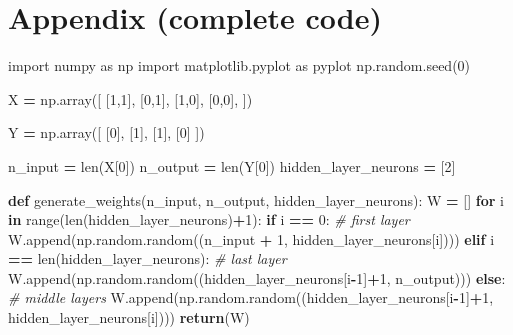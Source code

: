 \documentclass[
]{book}
\newenvironment{Shaded}{\begin{snugshade}}{\end{snugshade}}
\newcommand{\BuiltInTok}[1]{#1}
\newcommand{\CommentTok}[1]{\textcolor[rgb]{0.56,0.35,0.01}{\textit{#1}}}
\newcommand{\ControlFlowTok}[1]{\textcolor[rgb]{0.13,0.29,0.53}{\textbf{#1}}}
\newcommand{\DecValTok}[1]{\textcolor[rgb]{0.00,0.00,0.81}{#1}}
\newcommand{\ImportTok}[1]{#1}
\newcommand{\KeywordTok}[1]{\textcolor[rgb]{0.13,0.29,0.53}{\textbf{#1}}}
\newcommand{\NormalTok}[1]{#1}
\newcommand{\OperatorTok}[1]{\textcolor[rgb]{0.81,0.36,0.00}{\textbf{#1}}}
\begin{document}
\hypertarget{appendix-complete-code-2}{%
\section{Appendix (complete code)}\label{appendix-complete-code-2}}

\begin{Shaded}
\begin{Highlighting}[]
\ImportTok{import}\NormalTok{ numpy }\ImportTok{as}\NormalTok{ np}
\ImportTok{import}\NormalTok{ matplotlib.pyplot }\ImportTok{as}\NormalTok{ pyplot}
\NormalTok{np.random.seed(}\DecValTok{0}\NormalTok{)}

\NormalTok{X }\OperatorTok{=}\NormalTok{ np.array([}
\NormalTok{  [}\DecValTok{1}\NormalTok{,}\DecValTok{1}\NormalTok{],}
\NormalTok{  [}\DecValTok{0}\NormalTok{,}\DecValTok{1}\NormalTok{],}
\NormalTok{  [}\DecValTok{1}\NormalTok{,}\DecValTok{0}\NormalTok{],}
\NormalTok{  [}\DecValTok{0}\NormalTok{,}\DecValTok{0}\NormalTok{],}
\NormalTok{])}

\NormalTok{Y }\OperatorTok{=}\NormalTok{ np.array([}
\NormalTok{  [}\DecValTok{0}\NormalTok{],}
\NormalTok{  [}\DecValTok{1}\NormalTok{],}
\NormalTok{  [}\DecValTok{1}\NormalTok{],}
\NormalTok{  [}\DecValTok{0}\NormalTok{]}
\NormalTok{])}

\NormalTok{n\_input }\OperatorTok{=} \BuiltInTok{len}\NormalTok{(X[}\DecValTok{0}\NormalTok{])}
\NormalTok{n\_output }\OperatorTok{=} \BuiltInTok{len}\NormalTok{(Y[}\DecValTok{0}\NormalTok{])}
\NormalTok{hidden\_layer\_neurons }\OperatorTok{=}\NormalTok{ [}\DecValTok{2}\NormalTok{]}


\KeywordTok{def}\NormalTok{ generate\_weights(n\_input, n\_output, hidden\_layer\_neurons):}
\NormalTok{  W }\OperatorTok{=}\NormalTok{ []}
  \ControlFlowTok{for}\NormalTok{ i }\KeywordTok{in} \BuiltInTok{range}\NormalTok{(}\BuiltInTok{len}\NormalTok{(hidden\_layer\_neurons)}\OperatorTok{+}\DecValTok{1}\NormalTok{):}
    \ControlFlowTok{if}\NormalTok{ i }\OperatorTok{==} \DecValTok{0}\NormalTok{: }\CommentTok{\# first layer}
\NormalTok{      W.append(np.random.random((n\_input }\OperatorTok{+} \DecValTok{1}\NormalTok{, hidden\_layer\_neurons[i])))}
    \ControlFlowTok{elif}\NormalTok{ i }\OperatorTok{==} \BuiltInTok{len}\NormalTok{(hidden\_layer\_neurons): }\CommentTok{\# last layer}
\NormalTok{      W.append(np.random.random((hidden\_layer\_neurons[i}\OperatorTok{{-}}\DecValTok{1}\NormalTok{]}\OperatorTok{+}\DecValTok{1}\NormalTok{, n\_output)))}
    \ControlFlowTok{else}\NormalTok{: }\CommentTok{\# middle layers}
\NormalTok{      W.append(np.random.random((hidden\_layer\_neurons[i}\OperatorTok{{-}}\DecValTok{1}\NormalTok{]}\OperatorTok{+}\DecValTok{1}\NormalTok{, hidden\_layer\_neurons[i])))}
  \ControlFlowTok{return}\NormalTok{(W)}


\end{Highlighting}
\end{Shaded}
\end{document}
